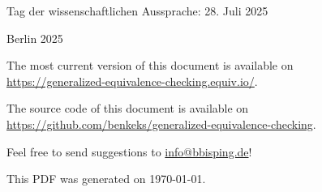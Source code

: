 \begin{titlepage}
    \vspace{1em}

    \noindent
    Tag der wissenschaftlichen Aussprache: 28. Juli 2025\\

    \vfill

    \begin{center}
        Berlin 2025\\[1em]
    \end{center}

\end{titlepage}
\restoregeometry


\newpage
\thispagestyle{empty}
\par\vspace*{\fill}

\noindent

\vspace{0.5cm}

\noindent
The most current version of this document is available on\\
\url{https://generalized-equivalence-checking.equiv.io/}.

\vspace{0.5cm}

\noindent
The source code of this document is available on\\
\url{https://github.com/benkeks/generalized-equivalence-checking}.

\vspace{0.5cm}

\noindent
Feel free to send suggestions to \href{mailto:info@bbisping.de}{info@bbisping.de}!

\vspace{0.5cm}

\noindent
This PDF was generated on \today.
\clearpage

%

\let\mainmatterforreal=\mainmatter
\renewcommand{\mainmatter}{}